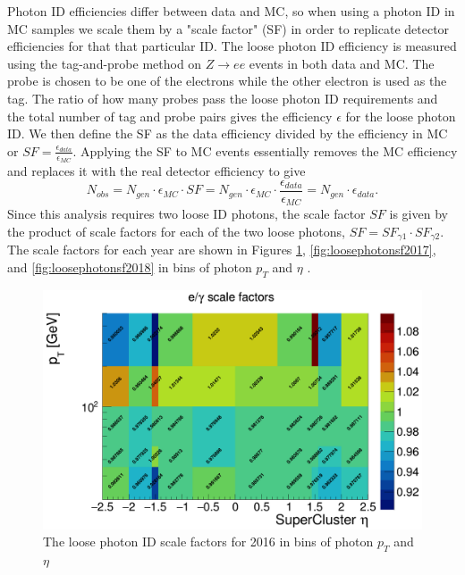 Photon ID efficiencies differ between data and MC, so when using a photon ID in MC samples we scale them by a "scale factor" (SF) in order to replicate detector efficiencies for that that particular ID.  The loose photon ID efficiency is measured using the tag-and-probe method on $Z\rightarrow ee$ events in both data and MC.  The probe is chosen to be one of the electrons while the other electron is used as the tag.  The ratio of how many probes pass the loose photon ID requirements and the total number of tag and probe pairs gives the efficiency $\epsilon$ for the loose photon ID.  We then define the SF as the data efficiency divided by the efficiency in MC or $SF = \frac{\epsilon_{data}}{\epsilon_{MC}}$.  Applying the SF to MC events essentially removes the MC efficiency and replaces it with the real detector efficiency to give
\begin{equation}
	N_{obs} = N_{gen}\cdot \epsilon_{MC}\cdot SF =  N_{gen}\cdot \epsilon_{MC}\cdot \frac{\epsilon_{data}}{\epsilon_{MC}} = N_{gen}\cdot \epsilon_{data}.
\end{equation}
Since this analysis requires two loose ID photons, the scale factor $SF$ is given by the product of scale factors for each of the two loose photons, $SF = SF_{\gamma1}\cdot SF_{\gamma2}$.  The scale factors for each year are shown in Figures \ref{fig:loosephotonsf2016}, \ref{fig:loosephotonsf2017}, and \ref{fig:loosephotonsf2018} in bins of photon $p_T$ and $\eta$ \cite{PhotonSF}.

\begin{figure}[h]
	\centering
	\includegraphics[width=0.9\linewidth]{Figures/LoosePhotonSF_2016}
	\caption[Scale factors for 2016 loose photon ID.]{The loose photon ID scale factors for 2016 in bins of photon $p_T$ and $\eta$}
	\label{fig:loosephotonsf2016}
\end{figure}

